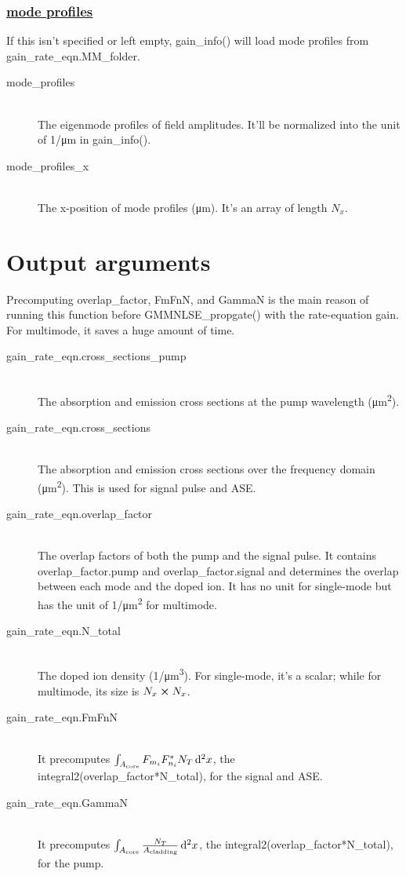 \documentclass[12pt,hidelinks]{book}
\begin{document}
\subsubsection{\underline{mode profiles}}
If this isn't specified or left empty, gain\_info() will load mode profiles from gain\_rate\_eqn.MM\_folder.

\begin{description}
\item[mode\_profiles]\mbox{}\\
The eigenmode profiles of field amplitudes. It'll be normalized into the unit of \si{1/\um} in gain\_info().

\item[mode\_profiles\_x]\mbox{}\\
The x-position of mode profiles (\si{\um}). It's an array of length $N_x$.
\end{description}

\section{Output arguments}
Precomputing overlap\_factor, FmFnN, and GammaN is the main reason of running this function before GMMNLSE\_propgate() with the rate-equation gain. For multimode, it saves a huge amount of time.

\begin{description}
\item[gain\_rate\_eqn.cross\_sections\_pump]\mbox{}\\
The absorption and emission cross sections at the pump wavelength (\si{\um^2}).

\item[gain\_rate\_eqn.cross\_sections]\mbox{}\\
The absorption and emission cross sections over the frequency domain (\si{\um^2}). This is used for signal pulse and ASE.

\item[gain\_rate\_eqn.overlap\_factor]\mbox{}\\
The overlap factors of both the pump and the signal pulse. It contains overlap\_factor.pump and overlap\_factor.signal and determines the overlap between each mode and the doped ion. It has no unit for single-mode but has the unit of \si{1/\um^2} for multimode.

\item[gain\_rate\_eqn.N\_total]\mbox{}\\
The doped ion density (\si{1/\um^3}). For single-mode, it's a scalar; while for multimode, its size is $N_x\cross N_x$.

\item[gain\_rate\_eqn.FmFnN]\mbox{}\\
It precomputes $\int_{A_{\text{core}}}F_{m_i}F_{n_i}^*N_T\mathop{}\!\mathrm{d}^2x$, the integral2(overlap\_factor*N\_total), for the signal and ASE.

\item[gain\_rate\_eqn.GammaN]\mbox{}\\
It precomputes $\int_{A_{\text{core}}}\frac{N_T}{A_{\text{cladding}}}\mathop{}\!\mathrm{d}^2x$, the integral2(overlap\_factor*N\_total), for the pump.
\end{description}
\end{document}
